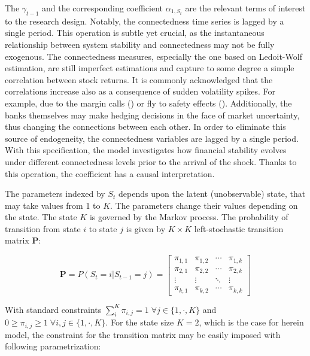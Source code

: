 \documentclass[12pt]{article}
\begin{document}
The $\gamma_{t-1}$ and the corresponding coefficient $\alpha_{1, S_t}$ are the relevant terms of interest to the research design. Notably, the connectedness time series is lagged by a single period. This operation is subtle yet crucial, as the instantaneous relationship between system stability and connectedness may not be fully exogenous. The connectedness measures, especially the one based on Ledoit-Wolf estimation, are still imperfect estimations and capture to some degree a simple correlation between stock returns. It is commonly acknowledged that the correlations increase also as a consequence of sudden volatility spikes. For example, due to the margin calls (\citet{kahraman19}) or fly to safety effects (\citet{baele19}). Additionally, the banks themselves may make hedging decisions in the face of market uncertainty, thus changing the connections between each other. In order to eliminate this source of endogeneity, the connectedness variables are lagged by a single period. With this specification, the model investigates how financial stability evolves under different connectedness levels prior to the arrival of the shock. Thanks to this operation, the coefficient has a causal interpretation. 

The parameters indexed by $S_t$ depends upon the latent (unobservable) state, that may take values from 1 to $K$. The parameters change their values depending on the state. The state $K$ is governed by the Markov process. The probability of transition from state $i$ to state $j$ is given by $K \times K$ left-stochastic transition matrix $\mathbf{P}$:

\begin{equation}
	\mathbf{P} = P(S_t = i | S_{t-1} = j) = 
	\begin{bmatrix}
		\pi_{1,1} & \pi_{1,2} & \cdots & \pi_{1,k} \\
		\pi_{2,1} & \pi_{2,2} & \cdots & \pi_{2,k} \\
		\vdots  & \vdots  & \ddots & \vdots  \\
		\pi_{k,1} & \pi_{k,2} & \cdots & \pi_{k,k} 
	\end{bmatrix}
\end{equation}

With standard constraints $\sum_{i}^{K} \pi_{i,j} = 1 \; \forall j \in \{1,\cdot, K\}$ and $0 \geq \pi_{i,j} \geq 1 \; \forall i,j \in \{1,\cdot, K\}$. For the state size $K=2$, which is the case for herein model, the constraint for the transition matrix may be easily imposed with following parametrization:
\end{document}
